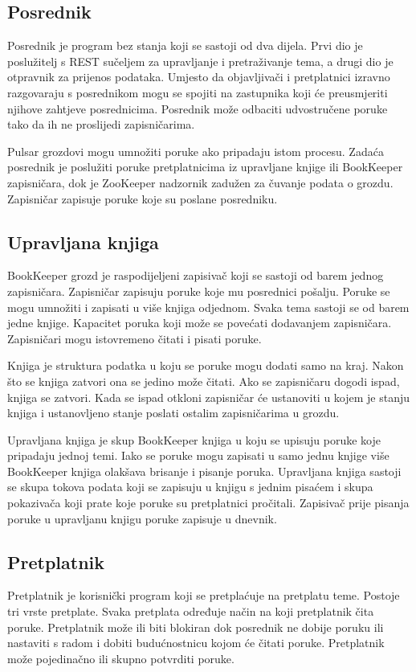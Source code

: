 \documentclass[utf8, diplomski, lmodern, numeric]{fer}
\begin{document}
\subsection{Posrednik}
Posrednik je program bez stanja koji se sastoji od dva dijela. Prvi dio je poslužitelj s REST sučeljem za upravljanje i pretraživanje tema, a drugi dio je otpravnik za prijenos podataka. Umjesto da objavljivači i pretplatnici izravno razgovaraju s posrednikom mogu se spojiti na zastupnika koji će preusmjeriti njihove zahtjeve posrednicima. Posrednik može odbaciti udvostručene poruke tako da ih ne proslijedi zapisničarima.

Pulsar grozdovi mogu umnožiti poruke ako pripadaju istom procesu. Zadaća posrednik je poslužiti poruke pretplatnicima iz upravljane knjige ili BookKeeper zapisničara, dok je ZooKeeper nadzornik zadužen za čuvanje podata o grozdu. Zapisničar zapisuje poruke koje su poslane posredniku.

\subsection{Upravljana knjiga}
BookKeeper grozd je raspodijeljeni zapisivač koji se sastoji od barem jednog zapisničara. Zapisničar zapisuju poruke koje mu posrednici pošalju. Poruke se mogu umnožiti i zapisati u više knjiga odjednom. Svaka tema sastoji se od barem jedne knjige. Kapacitet poruka koji može se povećati dodavanjem zapisničara. Zapisničari mogu istovremeno čitati i pisati poruke.

Knjiga je struktura podatka u koju se poruke mogu dodati samo na kraj. Nakon što se knjiga zatvori ona se jedino može čitati. Ako se zapisničaru dogodi ispad, knjiga se zatvori. Kada se ispad otkloni zapisničar će ustanoviti u kojem je stanju knjiga i ustanovljeno stanje poslati ostalim zapisničarima u grozdu.

Upravljana knjiga je skup BookKeeper knjiga u koju se upisuju poruke koje pripadaju jednoj temi. Iako se poruke mogu zapisati u samo jednu knjige više BookKeeper knjiga olakšava brisanje i pisanje poruka. Upravljana knjiga sastoji se skupa tokova podata koji se zapisuju u knjigu s jednim pisaćem i skupa pokazivača koji prate koje poruke su pretplatnici pročitali. Zapisivač prije pisanja poruke u upravljanu knjigu poruke zapisuje u dnevnik.

\subsection{Pretplatnik}
Pretplatnik je korisnički program koji se pretplaćuje na pretplatu teme. Postoje tri vrste pretplate. Svaka pretplata određuje način na koji pretplatnik čita poruke. Pretplatnik može ili biti blokiran dok posrednik ne dobije poruku ili nastaviti s radom i dobiti budućnostnicu kojom će čitati poruke. Pretplatnik može pojedinačno ili skupno potvrditi poruke.
\end{document}
